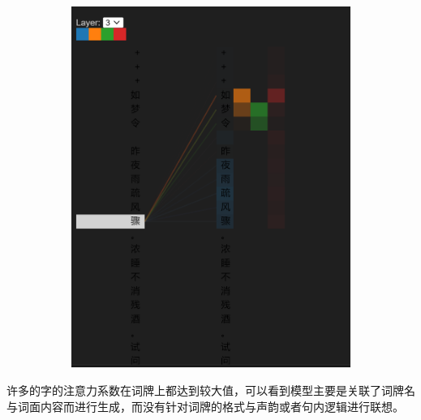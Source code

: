 \documentclass[a4paper]{article}
\begin{document}
\begin{figure}[H]
\begin{subfigure}[b]{.5\linewidth}
            \includegraphics[width=\linewidth]{../img/3-2.png}
        \end{subfigure}
\end{figure}

许多的字的注意力系数在词牌上都达到较大值，可以看到模型主要是关联了词牌名与词面内容而进行生成，而没有针对词牌的格式与声韵或者句内逻辑进行联想。
\end{document}
